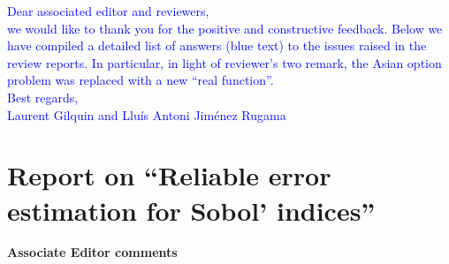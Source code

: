 \documentclass[10pt,a4paper]{article}
\begin{document}
\textcolor{blue}{Dear associated editor and reviewers,\\
we would like to thank you for the positive and constructive feedback. Below we have compiled a detailed list of answers (blue text) to the issues raised in the review reports. In particular, in light of reviewer's two remark, the Asian option problem was replaced with a new ``real function''.\\
Best regards,\\
Laurent Gilquin and Llu\'{i}s Antoni Jim\'{e}nez Rugama}

\section*{Report on ``Reliable error estimation for Sobol' indices''}

\textbf{\large{Associate Editor comments}}
\vspace*{0.5cm}
\end{document}
